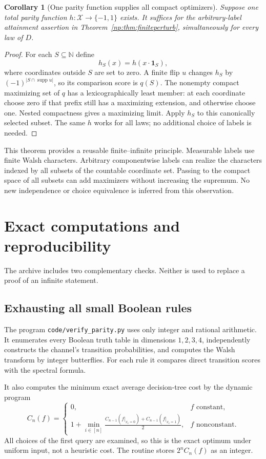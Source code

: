 \documentclass[11pt,a4paper]{article}
\newtheorem{corollary}[theorem]{Corollary}
\theoremstyle{definition}
\theoremstyle{remark}
\newcommand{\N}{\mathbb N}
\newcommand{\cX}{\mathcal X}
\newcommand{\supp}{\operatorname{supp}}
\newcommand{\one}{\mathbf 1}
\begin{document}
\begin{corollary}[One parity function supplies all compact optimizers]
\label{np:cor:uniformchoice}
Suppose one total parity function $h:\cX\to\{-1,1\}$ exists.
It suffices for the arbitrary-label attainment assertion in
Theorem~\ref{np:thm:finiteperturb}, simultaneously for every law of $D$.
\end{corollary}
\begin{proof}
For each $S\subseteq\N$ define
\[
 h_S(x)=h(x\cdot\one_S),
\]
where coordinates outside $S$ are set to zero. A finite flip $u$ changes
$h_S$ by $(-1)^{|S\cap\supp u|}$, so its comparison score is $q(S)$.
The nonempty compact maximizing set of $q$ has a lexicographically least
member: at each coordinate choose zero if that prefix still has a
maximizing extension, and otherwise choose one. Nested compactness gives
a maximizing limit. Apply $h_S$ to this canonically selected subset.
The same $h$ works for all laws; no additional choice of labels is needed.
\end{proof}

This theorem provides a reusable finite--infinite principle. Measurable
labels use finite Walsh characters. Arbitrary componentwise labels can
realize the characters indexed by all subsets of the countable coordinate
set. Passing to the compact space of all subsets can add maximizers
without increasing the supremum. No new independence or choice
equivalence is inferred from this observation.

\section{Exact computations and reproducibility}\label{np:sec:checks}

The archive includes two complementary checks. Neither is used to replace
a proof of an infinite statement.

\subsection{Exhausting all small Boolean rules}

The program \texttt{code/verify\_parity.py} uses only integer and rational
arithmetic. It enumerates every Boolean truth table in dimensions
\(1,2,3,4\), independently constructs the channel's transition
probabilities, and computes the Walsh transform by integer butterflies.
For each rule it compares direct transition scores with the spectral
formula.

It also computes the minimum exact average decision-tree cost by the
dynamic program
\[
 C_n(f)=
 \begin{cases}
 0,& f\text{ constant},\\
 1+\displaystyle\min_{i\in[n]}
 \frac{C_{n-1}(f|_{x_i=0})+C_{n-1}(f|_{x_i=1})}{2},
 & f\text{ nonconstant}.
 \end{cases}
\]
All choices of the first query are examined, so this is the exact optimum
under uniform input, not a heuristic cost. The routine stores
\(2^nC_n(f)\) as an integer.
\end{document}
